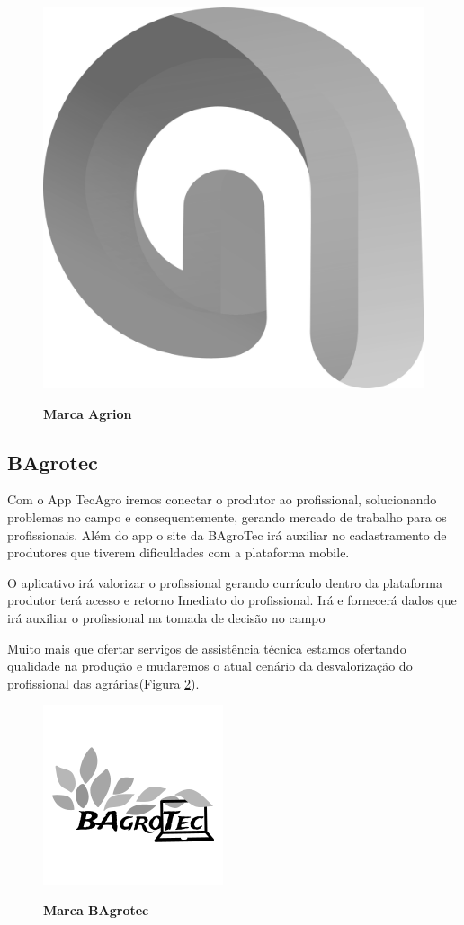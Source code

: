\begin{figure}[H]
\centering
\caption{\textbf{Marca Agrion}}
\includegraphics[scale=0.3]{Imagens/agrion.png}
\label{figura_14}
\end{figure}

\subsection{BAgrotec}

Com o App TecAgro iremos conectar o produtor ao profissional, solucionando problemas no campo e consequentemente, gerando mercado de trabalho para os profissionais. Além do app o site da BAgroTec irá auxiliar no cadastramento de produtores que tiverem dificuldades com a plataforma mobile.  

O aplicativo irá valorizar o profissional gerando currículo dentro da plataforma  produtor terá acesso e retorno Imediato do profissional. Irá e fornecerá dados que irá auxiliar o profissional na tomada de decisão no campo

Muito mais que ofertar serviços de assistência técnica estamos ofertando qualidade na produção e mudaremos o atual cenário da desvalorização do profissional das agrárias(Figura \ref{figura_15}).

\begin{figure}[H]
\centering
\caption{\textbf{Marca BAgrotec}}
\includegraphics[scale=1.0]{Imagens/bagrotec.png}
\label{figura_15}
\end{figure}


